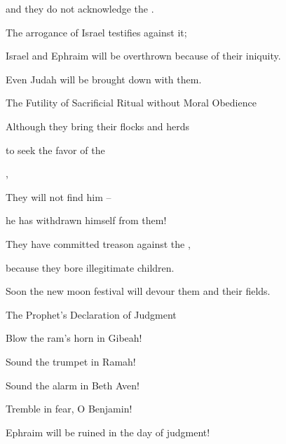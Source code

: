 {\par }{\Q and they do not
acknowledge
the {}.
\par }{\Q {}The arrogance
of Israel
testifies
against it;
\par }{\Q Israel
and Ephraim
will be overthrown
because of their iniquity.
\par }{\Q Even
Judah
will be brought down
with them.
\par }{\SH The Futility of Sacrificial Ritual without Moral Obedience
\par }{\Q {}Although they
bring their
flocks
and herds
\par }{\Q to seek
the favor of the

{},

\par }{\Q They will not
find him –
\par }{\Q he has withdrawn himself from them!
\par }{\Q {}They have committed treason
against the
{},
\par }{\Q because
they bore
illegitimate
children.
\par }{\Q Soon
the new moon
festival will devour
them and their fields.
\par }{\SH The Prophet’s Declaration of Judgment
\par }{\Q {}Blow
the ram’s horn
in Gibeah!
\par }{\Q Sound the trumpet
in Ramah!
\par }{\Q Sound the alarm
in Beth Aven!

\par }{\Q Tremble
in fear, O Benjamin!
\par }{\Q {}Ephraim
will be
ruined
in the day
of judgment!

}
